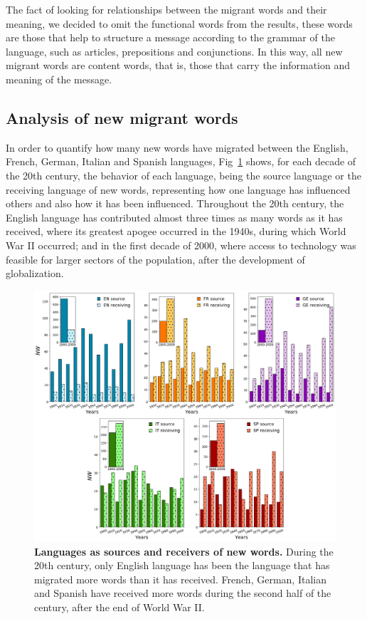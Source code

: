 \documentclass[10pt,letterpaper]{article} %
\begin{document}
The fact of looking for relationships between the migrant words and their
meaning, we decided to omit the functional words from the results, these words
are those that help to structure a message according to the grammar of the
language, such as articles, prepositions and conjunctions. In this way, all new
migrant words are content words, that is, those that carry the information and
meaning of the message.
\subsection*{Analysis of new migrant words} %

In order to quantify how many new words have migrated between the English,
French, German, Italian and Spanish languages, Fig~\ref{fig.NMW_OR} shows, for
each decade of the 20th century, the behavior of each language, being the
source language or the receiving language of new words, representing how one
language has influenced others and also how it has been influenced. Throughout
the 20th century, the English language has contributed almost three times as
many words as it has received, where its greatest apogee occurred in the
1940s, during which World War II occurred; and in the first decade of 2000,
where access to technology was feasible for larger sectors of the population,
after the development of globalization.


\begin{figure}[!h]
	\begin{adjustwidth}{-1.2in}{0in}
	\includegraphics[scale=.35]{NW_OR.png}
	\caption{{\bf Languages ​​as sources and receivers of new words.} During the 20th century, only English language has been the language that has migrated more words than it has received. French, German, Italian and Spanish have received more words during the second half of the century, after the end of World War II.}
	\label{fig.NMW_OR}
	\end{adjustwidth}
\end{figure}
\end{document}
